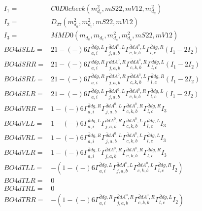 \documentclass[A4,landscape]{article}
\begin{document}
\begin{align} 
I_1 = & C0D0check(m^2_{d_{{c}}}, mS22, mV12, m^2_{d_{{a}}}) \\ 
I_2 = & D_{27}(m^2_{d_{{a}}}, m^2_{d_{{c}}}, mS22, mV12) \\ 
I_3 = & MMD0(m_{d_{{a}}}, m_{d_{{c}}}, m^2_{d_{{a}}}, m^2_{d_{{c}}}, mS22, mV12) \\ 
  BO4dSLL= & 2   1
-(-)
  6 \Gamma^{\bar{d}d g ,L}_{a, i} \Gamma^{\bar{d}d A^0 ,L}_{j, a, b} \Gamma^{\bar{d}d A^0 ,L}_{c, k, b} \Gamma^{\bar{d}d g ,R}_{l, c} (I_1 - 2 I_2) \\ 
  BO4dSRR= & 2   1
-(-)
  6 \Gamma^{\bar{d}d g ,R}_{a, i} \Gamma^{\bar{d}d A^0 ,R}_{j, a, b} \Gamma^{\bar{d}d A^0 ,R}_{c, k, b} \Gamma^{\bar{d}d g ,L}_{l, c} (I_1 - 2 I_2) \\ 
  BO4dSRL= & 2   1
-(-)
  6 \Gamma^{\bar{d}d g ,R}_{a, i} \Gamma^{\bar{d}d A^0 ,R}_{j, a, b} \Gamma^{\bar{d}d A^0 ,L}_{c, k, b} \Gamma^{\bar{d}d g ,R}_{l, c} (I_1 - 2 I_2) \\ 
  BO4dSLR= & 2   1
-(-)
  6 \Gamma^{\bar{d}d g ,L}_{a, i} \Gamma^{\bar{d}d A^0 ,L}_{j, a, b} \Gamma^{\bar{d}d A^0 ,R}_{c, k, b} \Gamma^{\bar{d}d g ,L}_{l, c} (I_1 - 2 I_2) \\ 
  BO4dVRR= &   1
-(-)
  6 \Gamma^{\bar{d}d g ,R}_{a, i} \Gamma^{\bar{d}d A^0 ,L}_{j, a, b} \Gamma^{\bar{d}d A^0 ,R}_{c, k, b} \Gamma^{\bar{d}d g ,R}_{l, c} I_3 \\ 
  BO4dVLL= &   1
-(-)
  6 \Gamma^{\bar{d}d g ,L}_{a, i} \Gamma^{\bar{d}d A^0 ,R}_{j, a, b} \Gamma^{\bar{d}d A^0 ,L}_{c, k, b} \Gamma^{\bar{d}d g ,L}_{l, c} I_3 \\ 
  BO4dVRL= &   1
-(-)
  6 \Gamma^{\bar{d}d g ,R}_{a, i} \Gamma^{\bar{d}d A^0 ,L}_{j, a, b} \Gamma^{\bar{d}d A^0 ,L}_{c, k, b} \Gamma^{\bar{d}d g ,L}_{l, c} I_3 \\ 
  BO4dVLR= &   1
-(-)
  6 \Gamma^{\bar{d}d g ,L}_{a, i} \Gamma^{\bar{d}d A^0 ,R}_{j, a, b} \Gamma^{\bar{d}d A^0 ,R}_{c, k, b} \Gamma^{\bar{d}d g ,R}_{l, c} I_3 \\ 
  BO4dTLL= & -(  1
-(-)
  6 \Gamma^{\bar{d}d g ,L}_{a, i} \Gamma^{\bar{d}d A^0 ,L}_{j, a, b} \Gamma^{\bar{d}d A^0 ,L}_{c, k, b} \Gamma^{\bar{d}d g ,R}_{l, c} I_2) \\ 
  BO4dTLR= & 0 \\ 
  BO4dTRL= & 0 \\ 
  BO4dTRR= & -(  1
-(-)
  6 \Gamma^{\bar{d}d g ,R}_{a, i} \Gamma^{\bar{d}d A^0 ,R}_{j, a, b} \Gamma^{\bar{d}d A^0 ,R}_{c, k, b} \Gamma^{\bar{d}d g ,L}_{l, c} I_2) \\ 
\end{align} 
\end{document}
